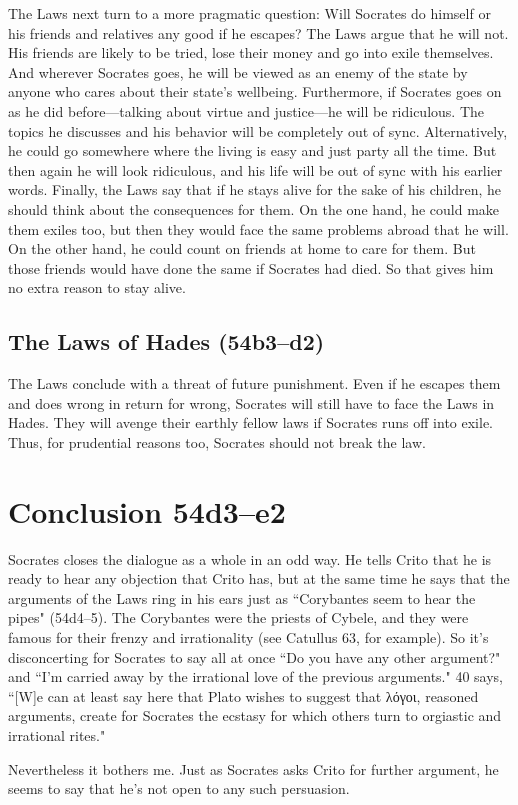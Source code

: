 \documentclass[11pt]{article}
\begin{document}
The Laws next turn to a more pragmatic question: Will Socrates do himself
or his friends and relatives any good if he escapes?  The Laws argue that
he will not.  His friends are likely to be tried, lose their money and go
into exile themselves.  And wherever Socrates goes, he will be viewed as an
enemy of the state by anyone who cares about their state's wellbeing.
Furthermore, if Socrates goes on as he did before---talking about virtue
and justice---he will be ridiculous.  The topics he discusses and his
behavior will be completely out of sync.  Alternatively, he could go
somewhere where the living is easy and just party all the time.  But then
again he will look ridiculous, and his life will be out of sync with his
earlier words.  Finally, the Laws say that if he stays alive for the sake
of his children, he should think about the consequences for them.  On the
one hand, he could make them exiles too, but then they would face the same
problems abroad that he will.  On the other hand, he could count on friends
at home to care for them.  But those friends would have done the same if
Socrates had died.  So that gives him no extra reason to stay alive.


\subsection{The Laws of Hades (54b3--d2)}

The Laws conclude with a threat of future punishment.  Even if he escapes
them and does wrong in return for wrong, Socrates will still have to face
the Laws in Hades.  They will avenge their earthly fellow laws if Socrates
runs off into exile.  Thus, for prudential reasons too, Socrates should not
break the law.



\section{Conclusion 54d3--e2}

Socrates closes the dialogue as a whole in an odd way.  He tells Crito that
he is ready to hear any objection that Crito has, but at the same time he
says that the arguments of the Laws ring in his ears just as ``Corybantes
seem to hear the pipes" (54d4--5).  The Corybantes were the priests of
Cybele, and they were famous for their frenzy and irrationality (see
Catullus 63, for example).  So it's disconcerting for Socrates to say all
at once ``Do you have any other argument?" and ``I'm carried away by the
irrational love of the previous arguments."  \citet{rose1983} 40 says,
``[W]e can at least say here that Plato wishes to suggest that {\g λόγοι},
reasoned arguments, create for Socrates the ecstasy for which others turn
to orgiastic and irrational rites."

Nevertheless it bothers me.  Just as Socrates asks Crito for further
argument, he seems to say that he's not open to any such persuasion.


\newpage


\end{document}
